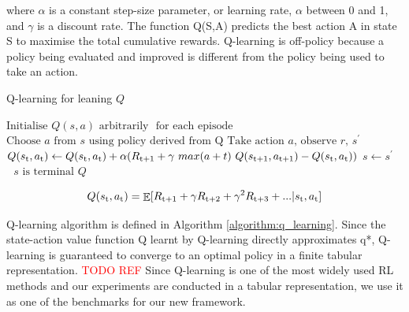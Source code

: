 \documentclass[11pt,twoside]{report}
\theoremstyle{plain}
\theoremstyle{definition}
\DeclareMathOperator{\E}{\mathbb{E}}
\begin{document}
where $\alpha$ is a constant step-size parameter, or learning rate, $\alpha$ between 0 and 1,  and $\gamma$ is a discount rate. 
The function Q(S,A) predicts the best action A in state S to maximise the total cumulative rewards. Q-learning is off-policy because a policy being evaluated and improved is different from the policy being used to take an action.

\begin{algorithm}
\caption{Q-learning for leaning $Q$}
\label{algorithm:q_learning}
\begin{algorithmic}[1]
\Procedure{}{}
\State $\text{Initialise $Q(s,a)$ arbitrarily}$
\Repeat$\text{\ for each episode}$
\State $\text{Choose $a$ from $s$ using policy derived from Q}$
\State $\text{Take action $a$, observe $r$,  $s^\prime$}$
\State $Q(s\textsubscript{t},a\textsubscript{t}) \leftarrow Q(s\textsubscript{t},a\textsubscript{t}) +  \alpha(R\textsubscript{t+1} + \gamma \ max (a+t) \ Q(s\textsubscript{t+1}, a\textsubscript{t+1}) - Q(s\textsubscript{t}, a\textsubscript{t}))$
\State $ s \leftarrow s^\prime $
\Until $\text{ $s$ is terminal}$ 
\Return $Q$ 
\EndProcedure

\end{algorithmic}
\end{algorithm}

\begin{equation}
Q(s\textsubscript{t},a\textsubscript{t}) = \displaystyle \E [R\textsubscript{t+1} + \gamma R\textsubscript{t+2} + \gamma^2 R\textsubscript{t+3} + ... \vert s\textsubscript{t},a\textsubscript{t} ]
\end{equation}

Q-learning algorithm is defined in Algorithm \ref{algorithm:q_learning}. Since the state-action value function Q learnt by Q-learning directly approximates q*, Q-learning is  guaranteed to converge to an optimal policy in a finite tabular representation. \textcolor{red}{TODO REF}
Since Q-learning is one of the most widely used RL methods and our experiments are conducted in a tabular representation, we use it as one of the benchmarks for our new framework.


\end{document}

